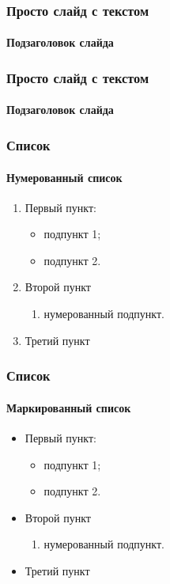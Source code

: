 \documentclass[aspectratio=169]{beamer}
\begin{document}
\begin{frame}
\frametitle{Просто слайд с текстом}
\framesubtitle{Подзаголовок слайда}
	\blindtext
\end{frame}

\begin{frame}
\frametitle{Просто слайд с текстом}
\framesubtitle{Подзаголовок слайда}
	\blindtext
\end{frame}

\begin{frame}
\frametitle{Список}
\framesubtitle{Нумерованный список}
	\begin{enumerate} 
		\item Первый пункт:
		\begin{itemize}
			\item подпункт 1;
			\item подпункт 2.
		\end{itemize}
		\item Второй пункт
		\begin{enumerate}
			\item нумерованный подпункт.
		\end{enumerate} 
		\item Третий пункт
	\end{enumerate} 
\end{frame}

\begin{frame}
\frametitle{Список}
\framesubtitle{Маркированный список}
	\begin{itemize}
		\item Первый пункт:
		\begin{itemize}
			\item подпункт 1;
			\item подпункт 2.
		\end{itemize}
		\item Второй пункт
		\begin{enumerate}
			\item нумерованный подпункт.
		\end{enumerate}
		\item Третий пункт
	\end{itemize}
\end{frame}
\end{document}
